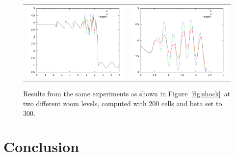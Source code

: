 \documentclass[10pt]{article}
\begin{document}
\begin{figure}
  \begin{center}
	\begin{tabular}{cc}
      \includegraphics[width=.475\textwidth]{300.png} &
	  \includegraphics[width=.475\textwidth]{300zoom.png}
	\end{tabular}
  \end{center}
  \caption{Results from the same experiments as shown in Figure~\ref{fig:shock}~at two different zoom levels, computed with 200 cells and beta set to 300.}
\end{figure}


\section{Conclusion}




\end{document}
